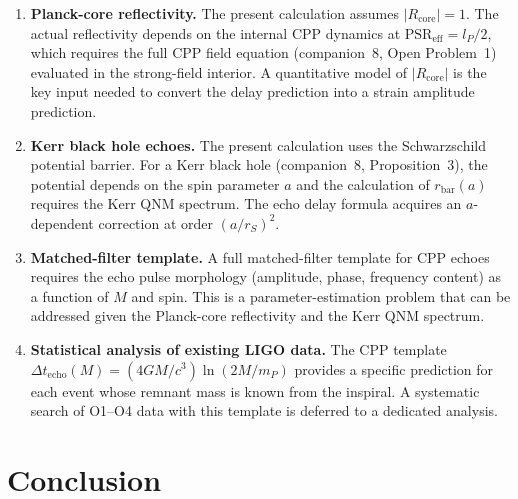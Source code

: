 \documentclass[12pt]{article}
\newcommand{\lP}{l_P}
\newcommand{\mP}{m_P}
\newcommand{\PSR}{\mathrm{PSR}}
\newcommand{\Dt}{\Delta t_{\mathrm{echo}}}
\begin{document}
\begin{enumerate}
  \item \textbf{Planck-core reflectivity.}
    The present calculation assumes $|R_{\mathrm{core}}| = 1$.  The actual
    reflectivity depends on the internal CPP dynamics at
    $\PSR_{\mathrm{eff}} = \lP/2$, which requires the full CPP field
    equation (companion~8, Open Problem~1) evaluated in the strong-field
    interior.  A quantitative model of $|R_{\mathrm{core}}|$ is the key
    input needed to convert the delay prediction into a strain amplitude
    prediction.

  \item \textbf{Kerr black hole echoes.}
    The present calculation uses the Schwarzschild potential barrier.
    For a Kerr black hole (companion~8, Proposition~3), the potential
    depends on the spin parameter $a$ and the calculation of
    $r_{\mathrm{bar}}(a)$ requires the Kerr QNM spectrum.  The echo delay
    formula acquires an $a$-dependent correction at order $(a/r_S)^2$.

  \item \textbf{Matched-filter template.}
    A full matched-filter template for CPP echoes requires the echo pulse
    morphology (amplitude, phase, frequency content) as a function of $M$
    and spin.  This is a parameter-estimation problem that can be addressed
    given the Planck-core reflectivity and the Kerr QNM spectrum.

  \item \textbf{Statistical analysis of existing LIGO data.}
    The CPP template $\Dt(M) = (4GM/c^3)\ln(2M/\mP)$ provides a specific
    prediction for each event whose remnant mass is known from the inspiral.
    A systematic search of O1--O4 data with this template is deferred to
    a dedicated analysis.
\end{enumerate}

\section{Conclusion}
\label{sec:conclusion}
\end{document}
